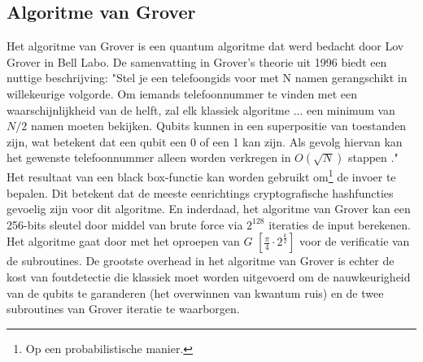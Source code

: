 \documentclass[11pt]{article}
\begin{document}
\subsection{Algoritme van Grover}

Het algoritme van Grover is een quantum algoritme dat werd bedacht door Lov Grover in Bell Labo. De samenvatting in Grover's theorie uit 1996 biedt een nuttige beschrijving: "Stel je een telefoongids voor met N namen gerangschikt in willekeurige volgorde. Om iemands telefoonnummer te vinden met een waarschijnlijkheid van de helft, zal elk klassiek algoritme ... een minimum van $N/2$ namen moeten bekijken. Qubits kunnen in een superpositie van toestanden zijn, wat betekent dat een qubit een 0 of een 1 kan zijn. Als gevolg hiervan kan het gewenste telefoonnummer alleen worden verkregen in $O(\sqrt{N})$ stappen \cite{lovgrover}."\\ 

\noindent Het resultaat van een black box-functie kan worden gebruikt om\footnote{Op een probabilistische manier.} de invoer te bepalen.
Dit betekent dat de meeste eenrichtings cryptografische hashfuncties gevoelig zijn voor dit algoritme. 
En inderdaad, het algoritme van Grover kan een 256-bits sleutel door middel van brute force via $2^{128}$ iteraties de input berekenen.\\ 

\noindent Het algoritme gaat door met het oproepen van $G$ $[\frac{\pi}{4} \cdot 2^{\frac{k}{2}}]$ voor de verificatie van de subroutines. De grootste overhead in het algoritme van Grover is echter de kost van foutdetectie die klassiek moet worden uitgevoerd om de nauwkeurigheid van de qubits te garanderen (het overwinnen van kwantum ruis) en de twee subroutines van Grover iteratie te waarborgen.\\
\end{document}
